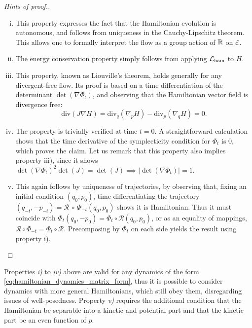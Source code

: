     \begin{proof}[Hints of proof.]
        \begin{enumerate}[i)]
            \item This property expresses the fact that the Hamiltonian evolution is autonomous, and follows from uniqueness in the Cauchy-Lipschitz theorem. This allows one to formally interpret the flow as a group action of $\mathbb{R}$ on $\mathcal E$.
            \item The energy conservation property simply follows from applying $\mathcal{L}_{\rm ham}$ to $H$.
            \item This property, known as Liouville's theorem, holds generally for any divergent-free flow. Its proof is based on a time differentiation of the determinant $\det\left(\nabla \Phi_t\right)$, and observing that the Hamiltonian vector field is divergence free: \[\mathrm{div}\left(J\nabla H\right)=\mathrm{div}_q\left(\nabla_p H\right)-\mathrm{div}_p\left(\nabla_q H\right)=0.\]
            \item The property is trivially verified at time $t=0$. A straightforward calculation shows that the time derivative of the symplecticity condition for $\Phi_t$ is $0$, which proves the claim. Let us remark that this property also implies property iii), since it shows $\det(\nabla\Phi_t)^2\det(J)=\det(J) \implies |\det(\nabla\Phi_t)|=1$.
            \item This again follows by uniqueness of trajectories, by observing that, fixing an initial condition $(q_0,p_0)$, time differentiating the trajectory $(q_{-t},-p_{-t})=\mathcal R\, \circ\, \Phi_{-t}(q_0,p_0)$  shows it is Hamiltonian. Thus it must coincide with $\Phi_t(q_0,-p_0)=\Phi_t \circ \mathcal R (q_0,p_0)$, or as an equality of mappings, $\mathcal R \circ \Phi_{-t}=\Phi_t \circ \mathcal R$. Precomposing by $\Phi_t$ on each side yields the result using property i).
        \end{enumerate}
    \end{proof}

    \begin{remark}
        \label{rem:non_separable_hamiltonian}
        Properties \textit{i)} to \textit{iv)} above are valid for any dynamics of the form \eqref{eq:hamiltonian_dynamics_matrix_form}, thus it is possible to consider dynamics 
        with more general Hamiltonians, which still obey them, disregarding issues of well-posedness. Property \textit{v)} requires the additional
        condition that the Hamiltonian be separable into a kinetic and potential part and that the kinetic part be an even function of $p$.
    \end{remark}   

